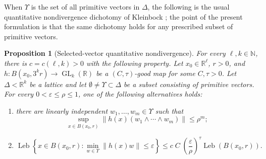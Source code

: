 \documentclass[reqno,11pt]{amsart}
\numberwithin{equation}{section}
\newtheorem{proposition}[theorem]{Proposition}
\theoremstyle{definition}
\theoremstyle{remark}
\newcommand{\op}{\operatorname}
\newcommand{\GL}{\op{GL}}
\begin{document}
When $\Upsilon$ is the set of all primitive vectors in $\Delta$, the following is the usual quantitative nondivergence dichotomy of Kleinbock \cite{kleinbock:2008}; the
point of the present formulation is that the same dichotomy holds for any
prescribed subset of primitive vectors.
\begin{proposition}[Selected-vector quantitative nondivergence]
\label{prop:Kle08variant}
For every $\ell,k\in\mathbb N$, there is 
$c=c(\ell,k)>0$ with the following property. Let
$x_0\in \mathbb R^\ell$, $r>0$,  and
$h:B(x_0,3^kr)\to\GL_k(\mathbb R)$ be a $(C,\tau)$-good map for some $C, \tau>0$. Let
$\Delta<\mathbb R^k$ be a lattice and let
$\emptyset\ne\Upsilon\subset\Delta$ be a subset consisting of primitive
vectors. For every
$0<\varepsilon\le\rho\le1$, one of the following alternatives holds:

\begin{enumerate}
\item there are linearly independent
$w_1,\dots,w_m\in\Upsilon$ such that
$$
\sup_{x\in B(x_0,r)}
\|h(x)(w_1\wedge\cdots\wedge w_m)\|
\le \rho^m;
$$

\item
$$
\operatorname{Leb}\left\{x\in B(x_0, r):
\min_{w\in\Upsilon}\|h(x)w\|\le\varepsilon\right\}
\le
c\; C\; \left(\frac{\varepsilon}{\rho}\right)^\tau
\operatorname{Leb}(B(x_0,r)).
$$
\end{enumerate}
\end{proposition}
\end{document}
